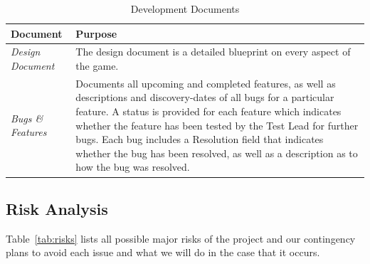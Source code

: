 \documentclass[12pt,titlepage]{article}
\begin{document}
\begin{table}[H]
    \centering
    \caption{Development Documents}
    \label{tab:dev_docs}
    \begin{tabularx}{\linewidth}{|l|X|}
        \hline
        {\bf Document}         & {\bf Purpose} \\ \hline
        {\it Design Document}  & The design document is a detailed blueprint on every
        aspect of the game. \\ \hline
        {\it Bugs \& Features} & Documents all upcoming and completed features, as well
        as descriptions and discovery-dates of all bugs for a
        particular feature. A status is provided for each
        feature which indicates whether the feature has been
        tested by the Test Lead for further bugs. Each bug
        includes a Resolution field that indicates whether the
        bug has been resolved, as well as a description as to
        how the bug was resolved. \\ \hline
    \end{tabularx}
\end{table}


\subsection{Risk Analysis}

Table~\ref{tab:risks} lists all possible major risks of the project and
our contingency plans to avoid each issue and what we will do in the case that
it occurs.
\end{document}

